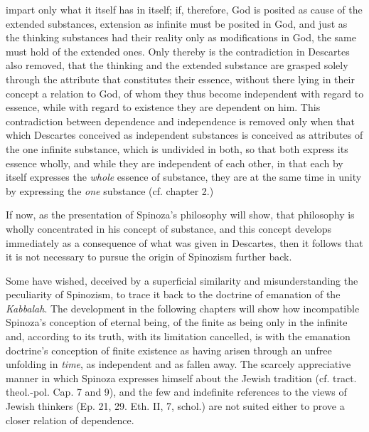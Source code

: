 \documentclass[12pt,a4paper,openany]{book}
\newcommand{\opage}[1]{\marginnote{\footnotesize\textit{[#1]}}}
\begin{document}
impart only what it itself has in itself; if, therefore, God is posited
as cause of the extended substances, extension as infinite must be
posited in God, and just as the thinking substances had their reality
only as modifications in God, the same must hold of the extended ones.
Only thereby is the contradiction in Descartes also removed, that the
thinking and the extended substance are grasped solely through the
attribute that constitutes their essence, without there lying in their
concept a relation to God, of whom they thus become independent with
regard to essence, while with regard to existence they are dependent on
him. This contradiction between dependence and independence is removed
only when that which Descartes conceived as independent substances is
conceived as attributes of the one infinite substance, which is
undivided in both, so that both express its essence wholly, and while
they are independent of each other, in that each by itself expresses the
\emph{whole} essence of substance, they are at the same time in unity by
expressing the \emph{one} substance (cf. chapter 2.)

If now, as the presentation of Spinoza's philosophy will show, that
philosophy is wholly concentrated in his concept of substance, and this
concept develops immediately as a consequence of what was given in
Descartes, then it follows that it is not necessary to pursue the origin
of Spinozism further back.

Some have wished, deceived by a superficial similarity and misunderstanding
the peculiarity of Spinozism, to trace it back to the doctrine of
emanation of the \emph{Kabbalah}. The development in the following
chapters will show how incompatible Spinoza's conception of eternal
being, of the finite as being only in the infinite and, according to its
truth, with its limitation cancelled, is with the emanation doctrine's
conception of finite existence as having arisen through an unfree
unfolding in
\opage{24}\setcounter{footnote}{0}\emph{time}, as independent and as fallen
away. The scarcely appreciative manner in which Spinoza expresses
himself about the Jewish tradition (cf. tract. theol.-pol. Cap. 7 and
9), and the few and indefinite references to the views of Jewish
thinkers (Ep. 21, 29. Eth. II, 7, schol.) are not suited either to prove
a closer relation of dependence.
\end{document}
